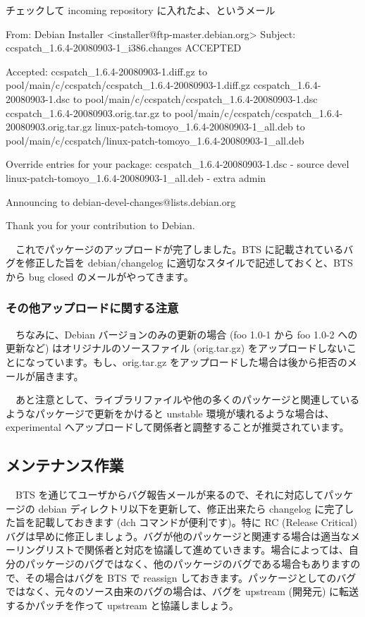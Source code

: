 \documentclass[mingoth,a4paper]{jsarticle}
\begin{document}
チェックして incoming repository に入れたよ、というメール

\begin{commandline}
From: Debian Installer <installer@ftp-master.debian.org>
Subject: ccspatch_1.6.4-20080903-1_i386.changes ACCEPTED

Accepted:
ccspatch_1.6.4-20080903-1.diff.gz
  to pool/main/c/ccspatch/ccspatch_1.6.4-20080903-1.diff.gz
ccspatch_1.6.4-20080903-1.dsc
  to pool/main/c/ccspatch/ccspatch_1.6.4-20080903-1.dsc
ccspatch_1.6.4-20080903.orig.tar.gz
  to pool/main/c/ccspatch/ccspatch_1.6.4-20080903.orig.tar.gz
linux-patch-tomoyo_1.6.4-20080903-1_all.deb
  to pool/main/c/ccspatch/linux-patch-tomoyo_1.6.4-20080903-1_all.deb


Override entries for your package:
ccspatch_1.6.4-20080903-1.dsc - source devel
linux-patch-tomoyo_1.6.4-20080903-1_all.deb - extra admin

Announcing to debian-devel-changes@lists.debian.org


Thank you for your contribution to Debian.
\end{commandline}

　これでパッケージのアップロードが完了しました。BTS に記載されているバグを修正した旨を debian/changelog に適切なスタイルで記述しておくと、BTS から bug closed のメールがやってきます。


\subsubsection{その他アップロードに関する注意}

　ちなみに、Debian バージョンのみの更新の場合 (foo 1.0-1 から foo 1.0-2 への更新など) はオリジナルのソースファイル (orig.tar.gz) をアップロードしないことになっています。もし、orig.tar.gz をアップロードした場合は後から拒否のメールが届きます。

　あと注意として、ライブラリファイルや他の多くのパッケージと関連しているようなパッケージで更新をかけると unstable 環境が壊れるような場合は、experimental へアップロードして関係者と調整することが推奨されています。


\subsection{メンテナンス作業}

　BTS を通じてユーザからバグ報告メールが来るので、それに対応してパッケージの debian ディレクトリ以下を更新して、修正出来たら changelog に完了した旨を記載しておきます (dch コマンドが便利です)。特に RC (Release Critical) バグは早めに修正しましょう。バグが他のパッケージと関連する場合は適当なメーリングリストで関係者と対応を協議して進めていきます。場合によっては、自分のパッケージのバグではなく、他のパッケージのバグである場合もありますので、その場合はバグを BTS で reassign しておきます。パッケージとしてのバグではなく、元々のソース由来のバグの場合は、バグを upstream (開発元) に転送するかパッチを作って upstream と協議しましょう。
\end{document}
